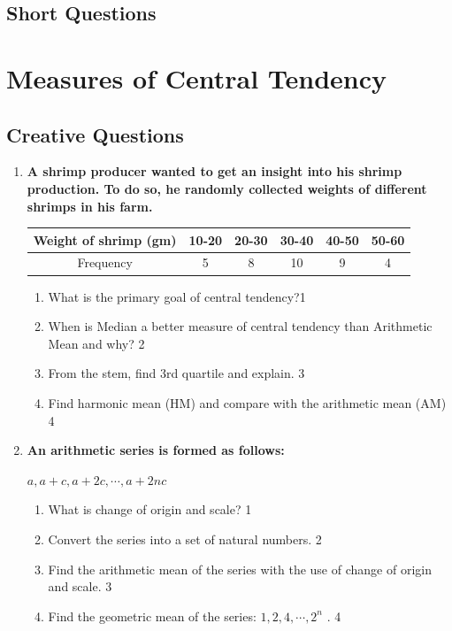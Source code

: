 \documentclass[a4paper,oneside]{book}
\begin{document}
\section{Short Questions}

\chapter{Measures of Central Tendency} 
\section{Creative Questions}
\begin{enumerate}

     \item
	  \textbf{A shrimp producer wanted to get an insight into his shrimp production. To do so, he randomly collected weights of different shrimps in his farm.} 
	  

	  \begin{table}[h]
	  \centering
\begin{tabular}{c|c|c|c|c|c}
Weight of shrimp (gm) & 10-20 & 20-30 & 30-40 & 40-50 & 50-60 \\ \hline
Frequency & 5 & 8 & 10 & 9 & 4
\end{tabular}
\end{table}

  \begin{enumerate}
    \item
	What is the primary goal of central tendency?\hfill 1
    \item
	When is Median a better measure of central tendency than Arithmetic Mean and why? \hfill 2
    \item  
	From the stem, find 3rd quartile and explain. \hfill 3
    \item
	Find harmonic mean (HM) and compare with the arithmetic mean (AM) \hfill 4
  \end{enumerate}

 \item
	  \textbf{An arithmetic series is formed as follows:}
	  
	   \begin{center}
  \textbf{$a, a+c, a+2c, \cdots, a+2nc$}
  \end{center}
  
  \begin{enumerate}
    \item
	What is change of origin and scale? \hfill 1
    \item
	Convert the series into a set of natural numbers. \hfill 2
    \item  
	Find the arithmetic mean of the series with the use of change of origin and scale. \hfill 3
    \item
	Find the geometric mean of the series: $1, 2, 4, \cdots , 2^n$ . \hfill 4
  \end{enumerate}


\end{enumerate}
\end{document}
